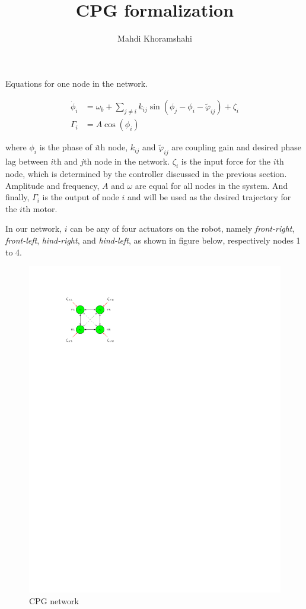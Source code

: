 \documentclass{article}
\begin{document}
\title{CPG formalization}
\author{Mahdi Khoramshahi}
\maketitle

Equations for one node in the network.

\begin{align}\label{eq:one_node}
	\dot \phi_i &= \omega_{b} + \sum_{j \neq i} k_{ij} \sin \left( \phi_j - \phi_i - \tilde{\varphi}_{ij} \right ) + \zeta_i\\
	\Gamma_i    &= A \cos(\phi_i)
\end{align}

where $\phi_i$ is the phase of \textit{i}th node, $k_{ij}$ and $\tilde{\varphi}_{ij}$ are coupling gain and desired phase lag between $i$th and $j$th node in the network. $\zeta_i$ is the input force for the $i$th node, which is determined by the controller discussed in the previous section. Amplitude and frequency, $A$ and $\omega$ are equal for all nodes in the system. And finally, $\Gamma_i$ is the output of node $i$ and will be used as the desired trajectory for the $i$th motor.

In our network, $i$ can be any of four actuators on the robot, namely \textit{front-right}, \textit{front-left}, \textit{hind-right}, and  \textit{hind-left}, as shown in figure below, respectively nodes 1 to 4.

\begin{figure}[thpb]
	\centering
		\centering
		\includegraphics[scale = 0.95]{schema_cropped.pdf}
		\centering
		\caption{CPG network}
		\label{fig:CPG_Network}
\end{figure}
\end{document}
